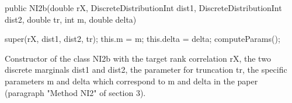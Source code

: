 \begin{code}

   public NI2b(double rX, DiscreteDistributionInt dist1,
               DiscreteDistributionInt dist2, double tr, int m,
               double delta)\begin{hide}
   {
      super(rX, dist1, dist2, tr);
      this.m = m;
      this.delta = delta;
      computeParams();
   }\end{hide}
\end{code}
\begin{tabb}
    Constructor of the class NI2b with the target rank correlation rX,
       the two discrete marginals dist1 and dist2,
       the parameter for truncation tr, the specific parameters m and
       delta which correspond to m and delta in the paper
       (paragraph "Method NI2" of section 3).
\end{tabb}

